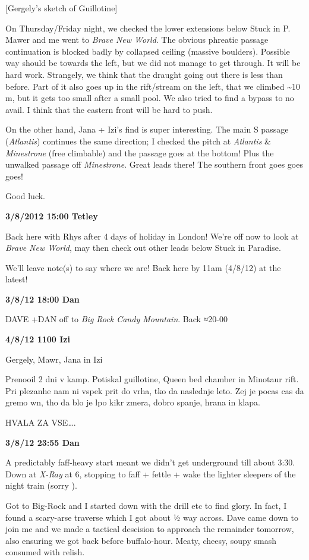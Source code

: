{[}Gergely's sketch of Guillotine{]}

On Thursday/Friday night, we checked the lower extensions below Stuck in
P. Mawer and me went to \emph{Brave New World}. The obvious phreatic
passage continuation is blocked badly by collapsed ceiling (massive
boulders). Possible way should be towards the left, but we did not
manage to get through. It will be hard work. Strangely, we think that
the draught going out there is less than before. Part of it also goes up
in the rift/stream on the left, that we climbed \textasciitilde 10 m,
but it gets too small after a small pool. We also tried to find a bypass
to no avail. I think that the eastern front will be hard to push.

On the other hand, Jana + Izi's find is super interesting. The main S
passage (\emph{Atlantis}) continues the same direction; I checked the
pitch at \emph{Atlantis} \& \emph{Minestrone} (free climbable) and the
passage goes at the bottom! Plus the unwalked passage off
\emph{Minestrone}. Great leads there! The southern front goes goes goes!

Good luck.

\textbf{3/8/2012 15:00 Tetley}

Back here with Rhys after 4 days of holiday in London! We're off now to
look at \emph{Brave New World}, may then check out other leads below
Stuck in Paradise.

We'll leave note(s) to say where we are! Back here by 11am (4/8/12) at
the latest!

\textbf{3/8/12 18:00 Dan}

DAVE +DAN off to \emph{Big Rock Candy Mountain}. Back ≈20-00

\textbf{4/8/12 1100 Izi}

Gergely, Mawr, Jana in Izi

Prenooil 2 dni v kamp. Potiskal guillotine, Queen bed chamber in
Minotaur rift. Pri plezanhe nam ni vspek prit do vrha, tko da naslednje
leto. Zej je pocas cas da gremo wn, tho da blo je lpo kikr zmera, dobro
spanje, hrana in klapa.

HVALA ZA VSE\ldots{}.

\textbf{3/8/12 23:55 Dan}

A predictably faff-heavy start meant we didn't get underground till
about 3:30. Down at \emph{X-Ray} at 6, stopping to faff + fettle + wake
the lighter sleepers of the night train (sorry ).

Got to Big-Rock and I started down with the drill etc to find glory. In
fact, I found a scary-arse traverse which I got about ½ way across. Dave
came down to join me and we made a tactical descision to approach the
remainder tomorrow, also ensuring we got back before buffalo-hour.
Meaty, cheesy, soupy smash consumed with relish.

